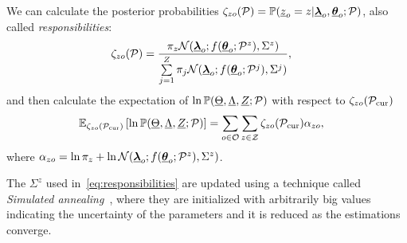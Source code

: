 \documentclass{ifacconf}  %
\begin{document}

We can calculate the posterior probabilities  $\zeta_{zo}(\mathcal{P})=\mathbb{P}(\underline{z}_{o}=z|{\underline{\boldsymbol{\lambda}}}_{o},{\underline{\boldsymbol{\theta}}}_{o};\mathcal{P})$, also called \emph{responsibilities}:
\begin{align}
  \label{eq:responsibilities}
\zeta_{zo}(\set{P})&=\frac{\pi_{z}{\mathcal{N}(\randomvec{\lambda}_{o};f(\randomvec{\theta}_{o};\set{P}^{z}),{\Sigma^{z}})}}{\sum\limits_{j=1}^{Z}\pi_{j}\mathcal{N}(\randomvec{\lambda}_{o};f(\randomvec{\theta}_{o};\set{P}^{j}),{\Sigma^{j}})},
\end{align}
and then calculate the expectation of ${\ln\mathbb{P}(\underline{\Theta},\underline{\Lambda},\underline{Z};\mathcal{P})}$ with respect to ${\zeta_{zo}(\mathcal{P}_{\mathrm{cur}})}$ \citep[Chapter 9]{Bishop2006}
\begin{align}
  \label{eq:completedataLogLikelihood_expectation}
\expectation[{\zeta_{zo}(\set{P}_{\mathrm{cur}})}]{\ln\probability{\random{\Theta},\random{\Lambda},\random{Z};\set{P}}}&= \sum_{o\in\set{O}}\sum_{z\in\set{Z}}  \zeta_{zo}(\set{P}_{\mathrm{cur}})\alpha_{zo},
\end{align}
where ${\alpha_{zo}=\ln{\pi_{z}}+\ln{\mathcal{N}({\underline{\boldsymbol{\lambda}}}_{o};f({\underline{\boldsymbol{\theta}}}_{o};\mathcal{P}^{z}),{\Sigma^{z}})}}$.

\begin{remark}
The $\Sigma^{z}$ used in~\eqref{eq:responsibilities} are updated using a technique called \emph{Simulated annealing}~\citep{OzerovFevotte2010}, where they are initialized with arbitrarily big values indicating the uncertainty of the parameters and it is reduced as the estimations converge.
\end{remark}
\end{document}
